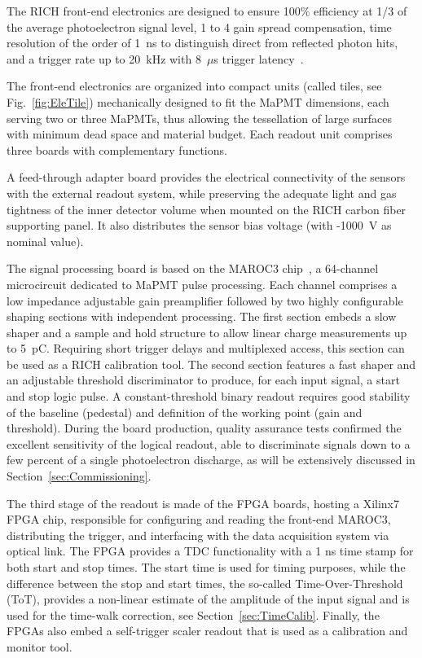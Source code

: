 \documentclass[5p,times,twocolumn]{elsarticle}
\begin{document}
The RICH front-end electronics are designed to ensure 100\% efficiency at 1/3 of the average photoelectron signal level, 1 to 4 gain spread compensation, time resolution of the order of 1~ns to distinguish direct from reflected photon hits, and a trigger rate up to 20~kHz with 8~$\mu$s trigger latency~\cite{Ref:RICHElectro}.

The front-end electronics are organized into compact units (called tiles, see Fig.~\ref{fig:EleTile}) mechanically designed to
fit the MaPMT dimensions, each serving two or three MaPMTs, thus allowing the tessellation of large surfaces with
minimum dead space and material budget. Each readout unit comprises three boards with complementary functions.

A feed-through adapter board provides the electrical connectivity of the sensors with the external readout
system, while preserving the adequate light and gas tightness of the inner detector volume when mounted on the RICH
carbon fiber supporting panel. It also distributes the sensor bias voltage (with -1000~V as nominal value).

The signal processing board is based on the MAROC3 chip~\cite{MAROC3:chip}, a 64-channel microcircuit
dedicated to MaPMT pulse processing. Each channel comprises a low impedance adjustable gain preamplifier followed
by two highly configurable shaping sections with independent processing. The first section embeds a slow shaper and
a sample and hold structure to allow linear charge measurements up to 5~pC. Requiring short trigger delays and
multiplexed access, this section can be used as a RICH calibration tool. The second section features a fast shaper and
an adjustable threshold discriminator to produce, for each input signal, a start and stop logic pulse. A constant-threshold
binary readout requires good stability of the baseline (pedestal) and definition of the working point (gain and
threshold). During the board production, quality assurance tests confirmed the excellent sensitivity of the logical
readout, able to discriminate signals down to a few percent of a single photoelectron discharge, as will be extensively
discussed in Section~\ref{sec:Commissioning}.

The third stage of the readout is made of the FPGA boards, hosting a Xilinx7 FPGA chip, responsible for configuring and reading the front-end MAROC3, distributing the trigger, and interfacing with the data acquisition system \cite{daq-nim} via optical link. The FPGA provides a TDC functionality with a 1 ns time stamp for both start and stop times. The start time is used for timing purposes, while the difference between the stop and start times, the so-called Time-Over-Threshold (ToT), provides a non-linear estimate of the amplitude of the input signal and is used for the time-walk correction, see Section~\ref{sec:TimeCalib}. Finally, the FPGAs also embed a self-trigger scaler readout that is used as a calibration and monitor tool.
\end{document}
